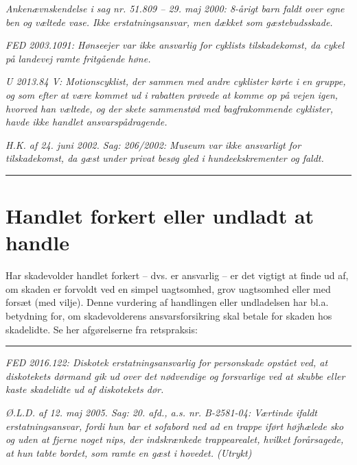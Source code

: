 \documentclass[]{book}
\begin{document}
\emph{Ankenævnskendelse i sag nr. 51.809 -- 29. maj 2000: 8-årigt barn faldt over egne ben og væltede vase. Ikke erstatningsansvar, men dækket som gæstebudsskade.}

\emph{FED 2003.1091: Hønseejer var ikke ansvarlig for cyklists tilskadekomst, da cykel på landevej ramte fritgående høne.}

\emph{U 2013.84 V: Motionscyklist, der sammen med andre cyklister kørte i en gruppe, og som efter at være kommet ud i rabatten prøvede at komme op på vejen igen, hvorved han væltede, og der skete sammenstød med bagfrakommende cyklister, havde ikke handlet ansvarspådragende.}

\emph{H.K. af 24. juni 2002. Sag: 206/2002: Museum var ikke ansvarligt for tilskadekomst, da gæst under privat besøg gled i hundeekskrementer og faldt.}

\begin{center}\rule{0.5\linewidth}{\linethickness}\end{center}

\hypertarget{handlet-forkert-eller-undladt-at-handle}{%
\section{Handlet forkert eller undladt at handle}\label{handlet-forkert-eller-undladt-at-handle}}

Har skadevolder handlet forkert -- dvs. er ansvarlig -- er det vigtigt at finde ud af, om skaden er forvoldt ved en simpel uagtsomhed, grov uagtsomhed eller med forsæt (med vilje). Denne vurdering af handlingen eller undladelsen har bl.a. betydning for, om skadevolderens ansvarsforsikring skal betale for skaden hos skadelidte. Se her afgørelserne fra retspraksis:

\begin{center}\rule{0.5\linewidth}{\linethickness}\end{center}

\emph{FED 2016.122: Diskotek erstatningsansvarlig for personskade opstået ved, at diskotekets dørmand gik ud over det nødvendige og forsvarlige ved at skubbe eller kaste skadelidte ud af diskotekets dør.}

\emph{Ø.L.D. af 12. maj 2005. Sag: 20. afd., a.s. nr. B-2581-04: Værtinde ifaldt erstatningsansvar, fordi hun bar et sofabord ned ad en trappe iført højhælede sko og uden at fjerne noget nips, der indskrænkede trappearealet, hvilket forårsagede, at hun tabte bordet, som ramte en gæst i hovedet. (Utrykt)}
\end{document}

